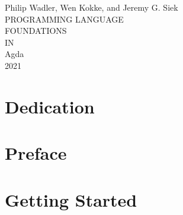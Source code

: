 \documentclass[10pt]{book}
\begin{document}
\setlength{\mathindent}{0pt}
\setlength{\parindent}{0em}
\setlength{\parskip}{1em}

\providecommand{\tightlist}{%
  \setlength{\itemsep}{0pt}\setlength{\parskip}{0pt}}

\begin{titlepage}
  \newlength{\drop}%
  \setlength{\drop}{0.12\textheight}%
  \centering%
  \vspace*{\drop}
  \begingroup%
  {\large Philip Wadler, Wen Kokke, and Jeremy G. Siek}\\[\baselineskip]
  {\Huge PROGRAMMING LANGUAGE}\\[\baselineskip]
  {\Huge FOUNDATIONS}\\[\baselineskip]
  {\Large IN}\\[\baselineskip]
  {\Huge Agda}\\[\drop]
  \vfill%
  {\small\scshape 2021}\par%
  \null\endgroup
\end{titlepage}




\frontmatter%
\setcounter{tocdepth}{0}

\tableofcontents%
\setcounter{tocdepth}{1}








\hypertarget{dedication}{%
  \chapter{Dedication}\label{dedication}}


\hypertarget{preface}{%
  \chapter{Preface}\label{preface}}


\hypertarget{gettingstarted}{%
  \chapter{Getting Started}\label{gettingstarted}}

\end{document}
